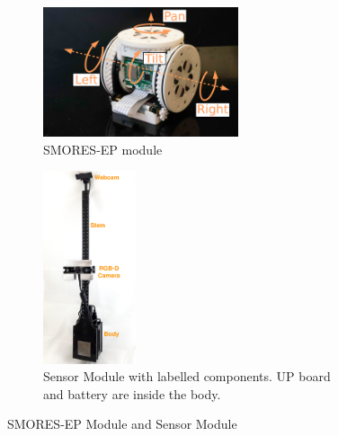 \documentclass[12pt]{article}
\begin{document}
\begin{figure}
  \begin{subfigure}{0.5\columnwidth}
  \begin{center}
  \includegraphics[height=1.5in]{images/smores_dof.pdf}
  \end{center}
  \caption{SMORES-EP module}
  \label{fig:smores-module}
  \end{subfigure}
  \begin{subfigure}{0.5\columnwidth}
  \begin{center}
  \includegraphics[width=0.3\textwidth]{images/sensor_module_new_labelled.jpg}
  \caption{Sensor Module with labelled components.  UP board and battery are inside the body.}
  \label{fig:sensor-module}
  \end{center}
  \end{subfigure}
  \caption{SMORES-EP Module and Sensor Module}
\end{figure}
\end{document}
